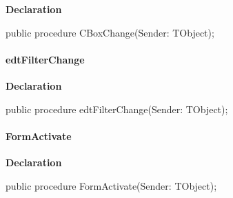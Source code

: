 \documentclass{report}
\newif\ifpdf
\begin{document}
\label{manager.TmnFrm-CBoxChange}
\begin{list}{}{
\setlength{\itemindent}{0cm}
\setlength{\listparindent}{0cm}
\setlength{\leftmargin}{\evensidemargin}
\addtolength{\leftmargin}{\tmplength}
\settowidth{\labelsep}{X}
\addtolength{\leftmargin}{\labelsep}
\setlength{\labelwidth}{\tmplength}
}
\item[\textbf{Declaration}\hfill]
\ifpdf
\begin{flushleft}
\fi
\begin{ttfamily}
public procedure CBoxChange(Sender: TObject);\end{ttfamily}

\ifpdf
\end{flushleft}
\fi

\end{list}
\paragraph*{edtFilterChange}\hspace*{\fill}

\label{manager.TmnFrm-edtFilterChange}
\begin{list}{}{
\setlength{\itemindent}{0cm}
\setlength{\listparindent}{0cm}
\setlength{\leftmargin}{\evensidemargin}
\addtolength{\leftmargin}{\tmplength}
\settowidth{\labelsep}{X}
\addtolength{\leftmargin}{\labelsep}
\setlength{\labelwidth}{\tmplength}
}
\item[\textbf{Declaration}\hfill]
\ifpdf
\begin{flushleft}
\fi
\begin{ttfamily}
public procedure edtFilterChange(Sender: TObject);\end{ttfamily}

\ifpdf
\end{flushleft}
\fi

\end{list}
\paragraph*{FormActivate}\hspace*{\fill}

\label{manager.TmnFrm-FormActivate}
\begin{list}{}{
\setlength{\itemindent}{0cm}
\setlength{\listparindent}{0cm}
\setlength{\leftmargin}{\evensidemargin}
\addtolength{\leftmargin}{\tmplength}
\settowidth{\labelsep}{X}
\addtolength{\leftmargin}{\labelsep}
\setlength{\labelwidth}{\tmplength}
}
\item[\textbf{Declaration}\hfill]
\ifpdf
\begin{flushleft}
\fi
\begin{ttfamily}
public procedure FormActivate(Sender: TObject);\end{ttfamily}

\ifpdf
\end{flushleft}
\fi

\end{list}
\end{document}
